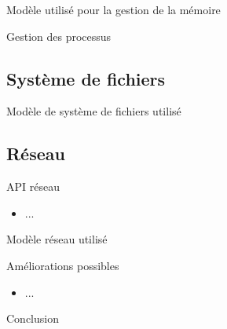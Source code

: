 \documentclass{beamer}
\begin{document}
\begin{frame}{Modèle utilisé pour la gestion de la mémoire}
    
\end{frame}

\begin{frame}{Gestion des processus}

\end{frame}

\subsection{Système de fichiers}
\begin{frame}{Modèle de système de fichiers utilisé}
    
\end{frame}

\subsection{Réseau}

\begin{frame}{API réseau}
    \begin{itemize}
        \item ...
    \end{itemize}
\end{frame}

\begin{frame}{Modèle réseau utilisé}
    
\end{frame}

\begin{frame}{Améliorations possibles}
    \begin{itemize}
        \item ...
    \end{itemize}
\end{frame}

\begin{frame}{Conclusion}
\end{frame}
\end{document}
